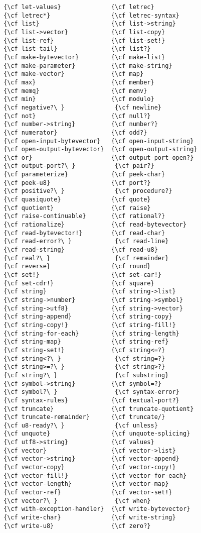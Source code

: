 \begin{verbatim}
{\cf let-values}              {\cf letrec}
{\cf letrec*}                 {\cf letrec-syntax}
{\cf list}                    {\cf list->string}
{\cf list->vector}            {\cf list-copy}
{\cf list-ref}                {\cf list-set!}
{\cf list-tail}               {\cf list?}
{\cf make-bytevector}         {\cf make-list}
{\cf make-parameter}          {\cf make-string}
{\cf make-vector}             {\cf map}
{\cf max}                     {\cf member}
{\cf memq}                    {\cf memv}
{\cf min}                     {\cf modulo}
{\cf negative?\ }              {\cf newline}
{\cf not}                     {\cf null?}
{\cf number->string}          {\cf number?}
{\cf numerator}               {\cf odd?}
{\cf open-input-bytevector}   {\cf open-input-string}
{\cf open-output-bytevector}  {\cf open-output-string}
{\cf or}                      {\cf output-port-open?}
{\cf output-port?\ }           {\cf pair?}
{\cf parameterize}            {\cf peek-char}
{\cf peek-u8}                 {\cf port?}
{\cf positive?\ }              {\cf procedure?}
{\cf quasiquote}              {\cf quote}
{\cf quotient}                {\cf raise}
{\cf raise-continuable}       {\cf rational?}
{\cf rationalize}             {\cf read-bytevector}
{\cf read-bytevector!}        {\cf read-char}
{\cf read-error?\ }            {\cf read-line}
{\cf read-string}             {\cf read-u8}
{\cf real?\ }                  {\cf remainder}
{\cf reverse}                 {\cf round}
{\cf set!}                    {\cf set-car!}
{\cf set-cdr!}                {\cf square}
{\cf string}                  {\cf string->list}
{\cf string->number}          {\cf string->symbol}
{\cf string->utf8}            {\cf string->vector}
{\cf string-append}           {\cf string-copy}
{\cf string-copy!}            {\cf string-fill!}
{\cf string-for-each}         {\cf string-length}
{\cf string-map}              {\cf string-ref}
{\cf string-set!}             {\cf string<=?}
{\cf string<?\ }               {\cf string=?}
{\cf string>=?\ }              {\cf string>?}
{\cf string?\ }                {\cf substring}
{\cf symbol->string}          {\cf symbol=?}
{\cf symbol?\ }                {\cf syntax-error}
{\cf syntax-rules}            {\cf textual-port?}
{\cf truncate}                {\cf truncate-quotient}
{\cf truncate-remainder}      {\cf truncate/}
{\cf u8-ready?\ }              {\cf unless}
{\cf unquote}                 {\cf unquote-splicing}
{\cf utf8->string}            {\cf values}
{\cf vector}                  {\cf vector->list}
{\cf vector->string}          {\cf vector-append}
{\cf vector-copy}             {\cf vector-copy!}
{\cf vector-fill!}            {\cf vector-for-each}
{\cf vector-length}           {\cf vector-map}
{\cf vector-ref}              {\cf vector-set!}
{\cf vector?\ }                {\cf when}
{\cf with-exception-handler}  {\cf write-bytevector}
{\cf write-char}              {\cf write-string}
{\cf write-u8}                {\cf zero?}
\end{verbatim}


